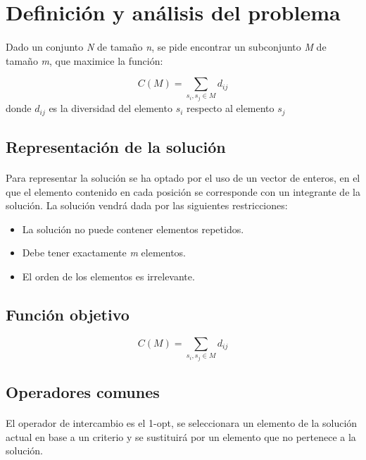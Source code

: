 \documentclass{article}
\begin{document}
	\section{Definición y análisis del problema}
	
	\paragraph{}Dado un conjunto \emph{N} de tamaño \emph{n}, se pide encontrar un subconjunto \emph{M} de tamaño \emph{m}, que maximice
	la función: 
	
	\[ C(M)=\sum_{s_i , s_j \in M} d_{ij}\]
	donde  $d_{ij}$ es la diversidad del elemento $s_i$ respecto al elemento $s_j$
	
	\subsection{Representación de la solución}
	
	\paragraph{} Para representar la solución se ha optado por el uso de un vector de enteros, en el que el elemento contenido en cada posición se corresponde con un integrante de la solución. La solución vendrá dada por las siguientes restricciones:
	\begin{itemize}
		
		\item La solución no puede contener elementos repetidos.
		
		\item Debe tener exactamente \emph{m} elementos.
		
		\item El orden de los elementos es irrelevante.
		
	\end{itemize}
	
	
	\subsection{Función objetivo}
	
	\[ C(M)=\sum_{s_i , s_j \in M} d_{ij}\]
	
	\subsection{Operadores comunes}
	
	\paragraph{}El operador de intercambio es el 1-opt, se seleccionara un elemento de la solución actual en base a un criterio y se sustituirá por un elemento que no pertenece a la solución. 
	
\end{document}

